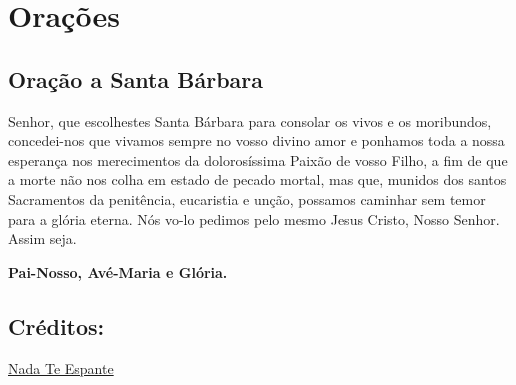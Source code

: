 \documentclass[11pt]{article}
\begin{document}
\newpage
\section{Orações}\label{oracoes}

\subsection{Oração a Santa Bárbara}

Senhor, que escolhestes Santa Bárbara para consolar os vivos e os moribundos, concedei-nos que vivamos sempre no vosso divino amor e ponhamos toda a nossa esperança nos merecimentos da dolorosíssima Paixão de vosso Filho, a fim de que a morte não nos colha em estado de pecado mortal, mas que, munidos dos santos Sacramentos da penitência, eucaristia e unção, possamos caminhar sem temor para a glória eterna. Nós vo-lo pedimos pelo mesmo Jesus Cristo, Nosso Senhor. Assim seja.

\textbf{Pai-Nosso, Avé-Maria e Glória.}

\subsection{Créditos:}
\href{https://www.nadateespante.com/products/novena-a-santa-barbara-para-sermos-preserverados-da-morte-repentina-ou-imprevista-/}{Nada Te Espante}
\end{document}
